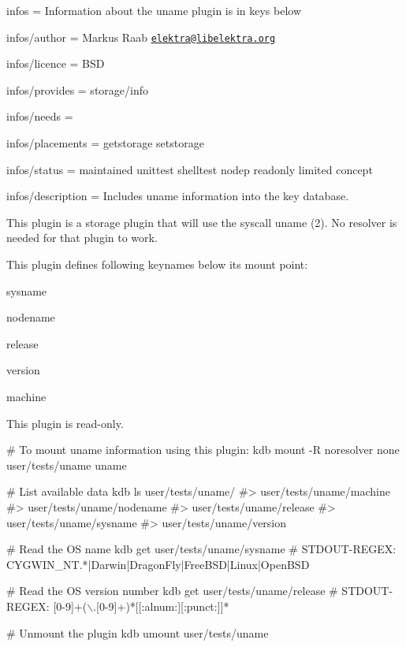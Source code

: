 
\begin{DoxyItemize}
\item infos = Information about the uname plugin is in keys below
\item infos/author = Markus Raab \href{mailto:elektra@libelektra.org}{\tt elektra@libelektra.\+org}
\item infos/licence = B\+SD
\item infos/provides = storage/info
\item infos/needs =
\item infos/placements = getstorage setstorage
\item infos/status = maintained unittest shelltest nodep readonly limited concept
\item infos/description = Includes uname information into the key database.
\end{DoxyItemize}

This plugin is a storage plugin that will use the syscall {\ttfamily uname (2)}. No resolver is needed for that plugin to work.

This plugin defines following keynames below its mount point\+:


\begin{DoxyItemize}
\item sysname
\item nodename
\item release
\item version
\item machine
\end{DoxyItemize}

This plugin is read-\/only.


\begin{DoxyCode}
# To mount uname information using this plugin:
kdb mount -R noresolver none user/tests/uname uname

# List available data
kdb ls user/tests/uname/
#> user/tests/uname/machine
#> user/tests/uname/nodename
#> user/tests/uname/release
#> user/tests/uname/sysname
#> user/tests/uname/version

# Read the OS name
kdb get user/tests/uname/sysname
# STDOUT-REGEX: CYGWIN\_NT.*|Darwin|DragonFly|FreeBSD|Linux|OpenBSD

# Read the OS version number
kdb get user/tests/uname/release
# STDOUT-REGEX: [0-9]+(\(\backslash\).[0-9]+)*[[:alnum:][:punct:]]*

# Unmount the plugin
kdb umount user/tests/uname
\end{DoxyCode}
 